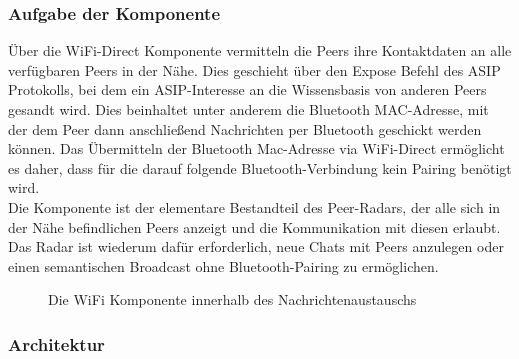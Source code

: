 \subsubsection{Aufgabe der Komponente}
Über die WiFi-Direct Komponente vermitteln die Peers ihre Kontaktdaten an alle ver\-füg\-ba\-ren Peers in der Nähe. Dies geschieht über den Expose Befehl des ASIP Protokolls, bei dem ein ASIP-Interesse an die Wissensbasis von anderen Peers gesandt wird. Dies beinhaltet unter anderem die Bluetooth MAC-Adresse, mit der dem Peer dann anschließend Nachrichten per Bluetooth geschickt werden können. Das Übermitteln der Bluetooth Mac-Adresse via WiFi-Direct ermöglicht es daher, dass für die darauf folgende Bluetooth-Verbindung kein Pairing benötigt wird. 
\\Die Komponente ist der elementare Bestandteil des Peer-Radars, der alle sich in der Nähe befindlichen Peers anzeigt und die Kommunikation mit diesen erlaubt. Das Radar ist wiederum dafür erforderlich, neue Chats mit Peers anzulegen oder einen semantischen Broadcast ohne Bluetooth-Pairing zu ermöglichen.
\begin{figure}[H]
	\centering
	\caption{Die WiFi Komponente innerhalb des Nachrichtenaustauschs}
	\label{fig:wifiComp}
\end{figure}
\newpage
\subsubsection{Architektur}

